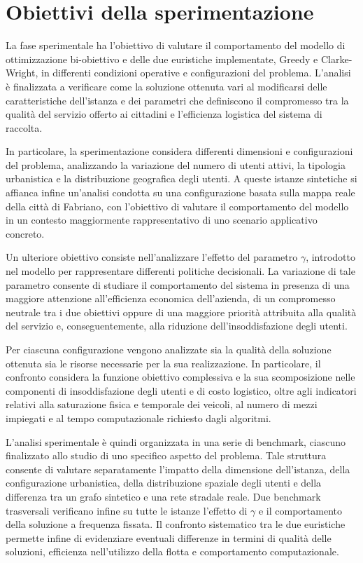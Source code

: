 \section{Obiettivi della sperimentazione}


La fase sperimentale ha l'obiettivo di valutare il comportamento del modello di ottimizzazione bi-obiettivo e delle due euristiche implementate, Greedy e Clarke-Wright, in differenti condizioni operative e configurazioni del problema. L'analisi è finalizzata a verificare come la soluzione ottenuta vari al modificarsi delle caratteristiche dell'istanza e dei parametri che definiscono il compromesso tra la qualità del servizio offerto ai cittadini e l'efficienza logistica del sistema di raccolta.

In particolare, la sperimentazione considera differenti dimensioni e configurazioni del problema, analizzando la variazione del numero di utenti attivi, la tipologia urbanistica e la distribuzione geografica degli utenti. A queste istanze sintetiche si affianca infine un'analisi condotta su una configurazione basata sulla mappa reale della città di Fabriano, con l'obiettivo di valutare il comportamento del modello in un contesto maggiormente rappresentativo di uno scenario applicativo concreto.

Un ulteriore obiettivo consiste nell'analizzare l'effetto del parametro $\gamma$, introdotto nel modello per rappresentare differenti politiche decisionali. La variazione di tale parametro consente di studiare il comportamento del sistema in presenza di una maggiore attenzione all'efficienza economica dell'azienda, di un compromesso neutrale tra i due obiettivi oppure di una maggiore priorità attribuita alla qualità del servizio e, conseguentemente, alla riduzione dell'insoddisfazione degli utenti.

Per ciascuna configurazione vengono analizzate sia la qualità della soluzione ottenuta sia le risorse necessarie per la sua realizzazione. In particolare, il confronto considera la funzione obiettivo complessiva e la sua scomposizione nelle componenti di insoddisfazione degli utenti e di costo logistico, oltre agli indicatori relativi alla saturazione fisica e temporale dei veicoli, al numero di mezzi impiegati e al tempo computazionale richiesto dagli algoritmi.

L'analisi sperimentale è quindi organizzata in una serie di benchmark, ciascuno finalizzato allo studio di uno specifico aspetto del problema. Tale struttura consente di valutare separatamente l'impatto della dimensione dell'istanza, della configurazione urbanistica, della distribuzione spaziale degli utenti e della differenza tra un grafo sintetico e una rete stradale reale. Due benchmark trasversali verificano infine su tutte le istanze l'effetto di $\gamma$ e il comportamento della soluzione a frequenza fissata. Il confronto sistematico tra le due euristiche permette infine di evidenziare eventuali differenze in termini di qualità delle soluzioni, efficienza nell'utilizzo della flotta e comportamento computazionale.


